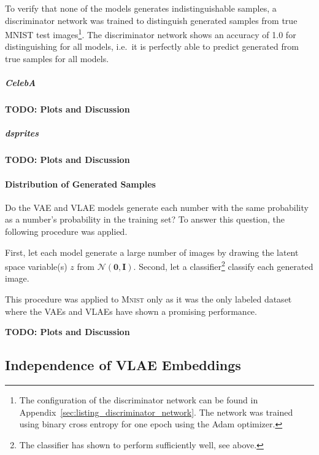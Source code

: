 To verify that none of the models generates indistinguishable samples, a discriminator network was trained to distinguish generated samples from true \textsc{MNIST} test images\footnote{The configuration of the discriminator network can be found in Appendix~\ref{sec:listing_discriminator_network}. The network was trained using binary cross entropy for one epoch using the Adam optimizer.}.
The discriminator network shows an accuracy of 1.0 for distinguishing for all models, i.e.~it is perfectly able to predict generated from true samples for all models.

\subparagraph{CelebA}
\textbf{TODO: Plots and Discussion}

\subparagraph{dsprites}
\textbf{TODO: Plots and Discussion}

\paragraph{Distribution of Generated Samples}

Do the \ac{VAE} and \ac{VLAE} models generate each number with the same probability as a number's probability in the training set?
To answer this question, the following procedure was applied.

First, let each model generate a large number of images by drawing the latent space variable(s) $z$ from $\mathcal{N}(\bm{0}, \bm{I})$.
Second, let a classifier\footnote{The classifier has shown to perform sufficiently well, see above.} classify each generated image.

This procedure was applied to \textsc{Mnist} only as it was the only labeled dataset where the \acp{VAE} and \acp{VLAE} have shown a promising performance.

\textbf{TODO: Plots and Discussion}

\subsection{Independence of VLAE Embeddings}\label{subsec:independence-of-vlae-embeddings}

